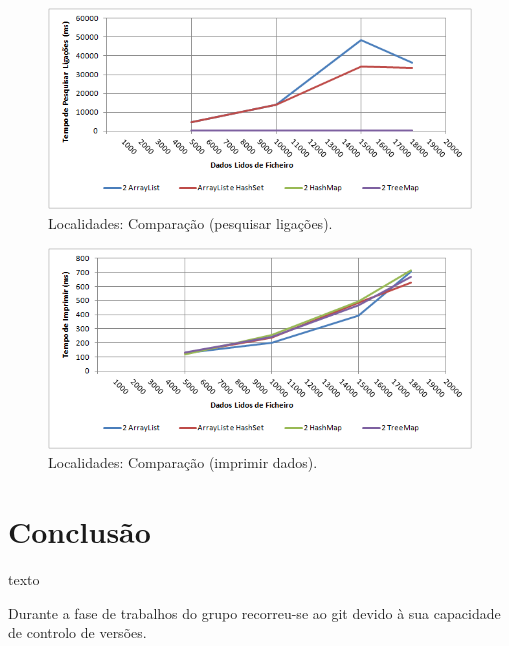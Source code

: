 \documentclass[a5paper,twocolumn, 11pt]{article}
\begin{document}
\begin{figure}[h!b!t!]
    \caption[Localidades: Comparação (pesquisar ligações)]{Localidades: Comparação (pesquisar ligações).}
    \label{hashtable}
    \centering
        \includegraphics[width=400pt]{cloc_o4.png}
\end{figure}
\begin{figure}[h!b!t!]
    \caption[Localidades: Comparação (imprimir dados)]{Localidades: Comparação (imprimir dados).}
    \label{hashtable}
    \centering
        \includegraphics[width=400pt]{cloc_o5.png}
\end{figure}


















\clearpage
\section{Conclusão}
texto

Durante a fase de trabalhos do grupo recorreu-se ao git devido à sua capacidade de controlo de versões.
\end{document}
